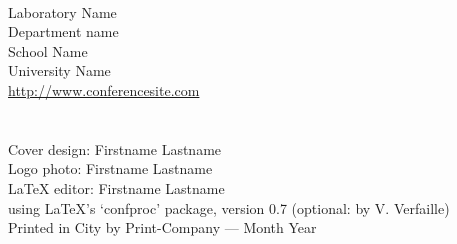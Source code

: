 

\frontmatter
\frontmattertocstyle
\setcounter{page}{1}
\maketitle
\renewcommand{\contentsname}{\texorpdfstring{}{Conference Program}}
\newpage
\vspace*{1.7cm}
\thispagestyle{empty}
\\ Laboratory Name\\ Department name\\
School Name\\ University Name\\
\url{http://www.conferencesite.com}\\
\vspace*{0.15cm}\newline
{}\\
\vspace*{0.35cm}\newline
{}\\
Cover design: Firstname Lastname\\
Logo photo: Firstname Lastname\\
\LaTeX{} editor: Firstname Lastname\\
using \LaTeX's `confproc' package, version 0.7 (optional: by V. Verfaille)\\
\vspace*{0.35cm}\newline
\noindent  Printed in City by Print-Company --- Month Year
\otherpagestyle
\clearsingleordoublepage
\vspace*{0.6cm}
\thisotherpagestyle
{}
